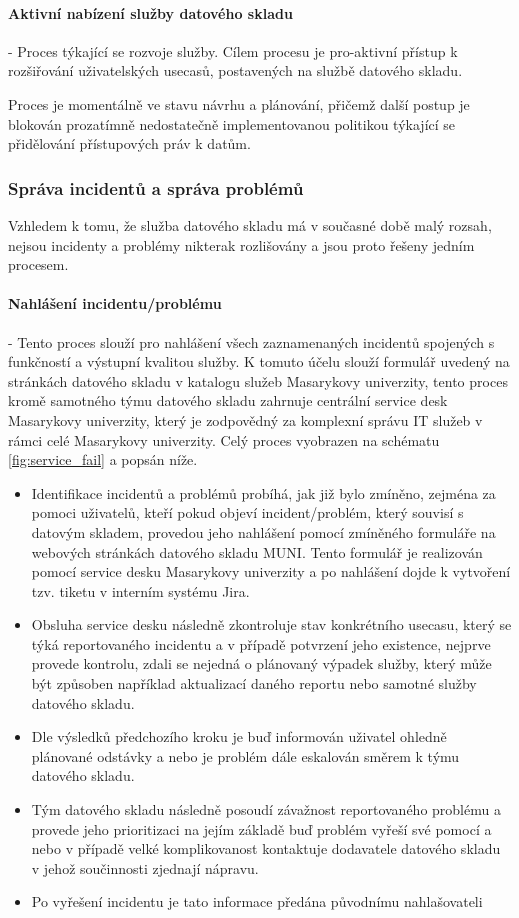 \documentclass[
  digital,     %
  twoside,     %
  lof,         %
  lot,         %
]{fithesis4}
\begin{document}
\paragraph{Aktivní nabízení služby datového skladu} - Proces týkající se rozvoje služby. Cílem procesu je pro-aktivní přístup k rozšiřování uživatelských usecasů, postavených na službě datového skladu.

Proces je momentálně ve stavu návrhu a plánování, přičemž další postup je blokován prozatímně nedostatečně implementovanou politikou týkající se přidělování přístupových práv k datům.

\subsubsection{Správa incidentů a správa problémů}
Vzhledem k tomu, že služba datového skladu má v současné době malý rozsah, nejsou incidenty a problémy nikterak rozlišovány a jsou proto řešeny jedním procesem. 

\paragraph{Nahlášení incidentu/problému} - Tento proces slouží pro nahlášení všech zaznamenaných incidentů spojených s funkčností a výstupní kvalitou služby. K tomuto účelu slouží formulář uvedený na stránkách datového skladu v katalogu služeb Masarykovy univerzity, tento proces kromě samotného týmu datového skladu zahrnuje centrální service desk Masarykovy univerzity, který je zodpovědný za komplexní správu IT služeb v rámci celé Masarykovy univerzity. Celý proces vyobrazen na schématu \ref{fig:service_fail} a popsán níže.
    \begin{itemize}
        \item Identifikace incidentů a problémů probíhá, jak již bylo zmíněno, zejména za pomoci uživatelů, kteří pokud objeví incident/problém, který souvisí s datovým skladem, provedou jeho nahlášení pomocí zmíněného formuláře na webových stránkách datového skladu MUNI. Tento formulář je realizován pomocí service desku Masarykovy univerzity a po nahlášení dojde k vytvoření tzv. tiketu v interním systému Jira. 
        \item Obsluha service desku následně zkontroluje stav konkrétního usecasu, který se týká reportovaného incidentu a v případě potvrzení jeho existence, nejprve provede kontrolu, zdali se nejedná o plánovaný výpadek služby, který může být způsoben například aktualizací daného reportu nebo samotné služby datového skladu. 
        \item Dle výsledků předchozího kroku je buď informován uživatel ohledně plánované odstávky a nebo je problém dále eskalován směrem k týmu datového skladu. 
        \item Tým datového skladu následně posoudí závažnost reportovaného problému a provede jeho prioritizaci na jejím základě buď problém vyřeší své pomocí a nebo v případě velké komplikovanost kontaktuje dodavatele datového skladu v jehož součinnosti zjednají nápravu. 
        \item Po vyřešení incidentu je tato informace předána původnímu nahlašovateli
    \end{itemize}
        
\end{document}
